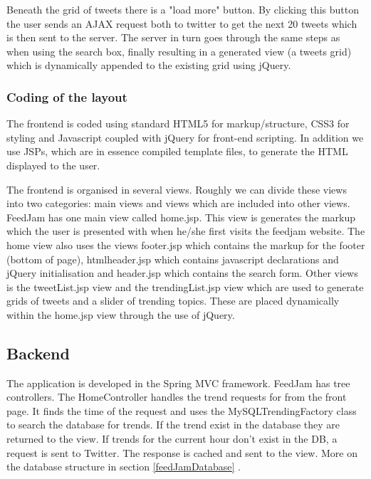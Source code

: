 Beneath the grid of tweets there is a "load more" button. By clicking this button the user sends an AJAX request both to twitter to get the next 20 tweets which is then sent to the server. The server in turn goes through the same steps as when using the search box, finally resulting in a generated view (a tweets grid) which is dynamically appended to the existing grid using jQuery.


\subsubsection{Coding of the layout}
The frontend is coded using standard HTML5 for markup/structure, CSS3 for styling and Javascript coupled with jQuery for front-end scripting. In addition we use JSPs, which are in essence compiled template files, to generate the HTML displayed to the user.

The frontend is organised in several views. Roughly we can divide these views into two categories: main views and views which are included into other views. FeedJam has one main view called home.jsp. This view is generates the markup which the user is presented with when he/she first visits the feedjam website. The home view also uses the views footer.jsp which contains the markup for the footer (bottom of page), htmlheader.jsp which contains javascript declarations and jQuery initialisation and header.jsp which contains the search form. Other views is the tweetList.jsp view and the trendingList.jsp view which are used to generate grids of tweets and a slider of trending topics. These are placed dynamically within the home.jsp view through the use of jQuery.


\subsection{Backend} %
The application is developed in the Spring MVC framework. FeedJam has tree controllers. The HomeController handles the trend requests for from the front page. It finds the time of the request and uses the MySQLTrendingFactory class to search the database for trends. If the trend exist in the database they are returned to the view. If trends for the current hour don't exist in the DB, a request is sent to Twitter. The response is cached and sent to the view. More on the database structure in section \ref{feedJamDatabase} .

